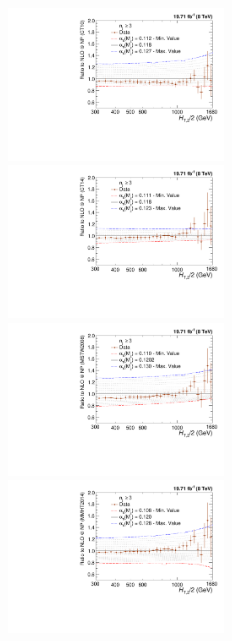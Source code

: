 \begin{figure}[!htbp]
 \begin{center}
 \hspace*{-5mm}\includegraphics[width=0.51\textwidth]{Plots_HT_2_150/Sensitivity_3_ratio_NLO_CT10.pdf}%
 ~~\includegraphics[width=0.51\textwidth]{Plots_HT_2_150/Sensitivity_3_ratio_NLO_CT14.pdf}\\
 \vspace*{3mm}
 \hspace*{-5mm}\includegraphics[width=0.51\textwidth]{Plots_HT_2_150/Sensitivity_3_ratio_NLO_MSTW2008.pdf}%
 ~~\includegraphics[width=0.51\textwidth]{Plots_HT_2_150/Sensitivity_3_ratio_NLO_MMHT2014.pdf}\\

\end{center}
\end{figure}
